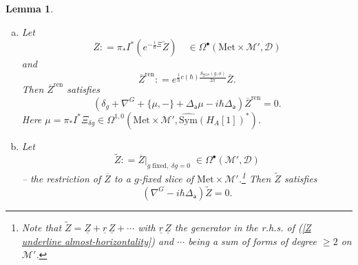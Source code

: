 \documentclass[11pt,a4paper]{amsart}
\theoremstyle{plain} %
\newtheorem{lem}[thm]{Lemma}
\theoremstyle{definition}
\theoremstyle{remark}
\newcommand{\mr}{\mathrm}
\newcommand{\sfa}{\mathsf{a}}
\newcommand{\bt}{\bullet}
\newcommand{\M}{\mathcal{M}}
\newcommand{\wh}{\widehat}
\newcommand{\til}{\widetilde}
\newcommand{\mc}{\mathcal}
\newcommand{\ul}{\underline}
\begin{document}
\begin{lem}\label{lemma 5.11}
\begin{enumerate}[(a)]
    \item 
    Let 
    \begin{equation}\label{olZ def}
        \overline{Z}\colon=\pi_*I^* (e^{-\frac{i}{\hbar}\Xi}\check{Z}) \quad \in \Omega^\bt(\mr{Met}\times \M',\mc{D})
    \end{equation}
    and 
    \begin{equation}\label{olZren def}
    \overline{Z}^\mr{ren}\colon= e^{\frac{i}{\hbar}c(\hbar) \frac{S_\mr{grav}(g,\phi)}{2\pi}} \overline{Z}.
    \end{equation}
    Then  $\overline{Z}^\mr{ren}$ satisfies
    \begin{equation}\label{olZ equation}
        (\delta_g+\nabla^G+\{\mu,-\}+\Delta_\sfa \mu-i\hbar \Delta_\sfa) \overline{Z}^\mr{ren}=0.
    \end{equation}
    Here $\mu=\pi_*I^* \Xi_{\delta g}\in \Omega^{1,0}(\mr{Met}\times \M',\wh{\mr{Sym}}(H_A[1])^*)$.
   \item  Let
    \begin{equation}\label{tilZ def}
        \til{Z}\colon= \overline{Z}|_{g\mr{\;fixed,\;}\delta g=0}\; \in \Omega^\bt(\M',\mc{D})
    \end{equation}
    -- the restriction of $\overline{Z}$ to a $g$-fixed slice of $\mr{Met}\times \M'$.\footnote{%
    Note that $\til{Z}=\ul{Z}+\ul{r}\,\ul{Z}+\cdots$ with $\ul{r}\,\ul{Z}$ the generator in the r.h.s. of (\ref{Z underline almost-horizontality}) and $\cdots$ being a sum of forms of degree $\geq 2$ on $\M'$. 
    } Then $\til{Z}$ satisfies
    \begin{equation}\label{tilZ equation}
        (\nabla^G-i\hbar\Delta_\sfa)\til{Z}=0.
    \end{equation}
\end{enumerate}
\end{lem}
\end{document}
